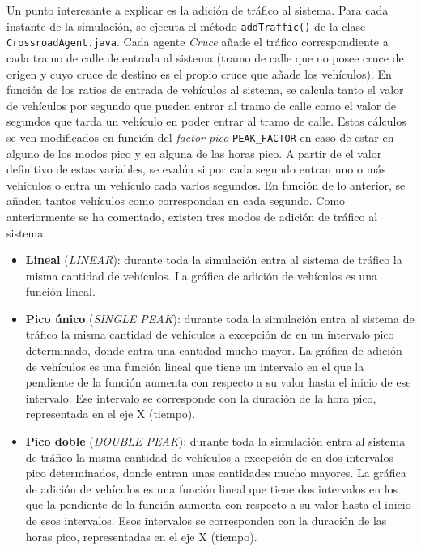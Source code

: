 Un punto interesante a explicar es la adición de tráfico al sistema. Para cada instante de la simulación, se ejecuta el método \lstinline{addTraffic()} de la clase \lstinline{CrossroadAgent.java}. Cada agente \textit{Cruce} añade el tráfico correspondiente a cada tramo de calle de entrada al sistema (tramo de calle que no posee cruce de origen y cuyo cruce de destino es el propio cruce que añade los vehículos). En función de los ratios de entrada de vehículos al sistema, se calcula tanto el valor de vehículos por segundo que pueden entrar al tramo de calle como el valor de segundos que tarda un vehículo en poder entrar al tramo de calle. Estos cálculos se ven modificados en función del \textit{factor pico} \lstinline{PEAK_FACTOR} en caso de estar en alguno de los modos pico y en alguna de las horas pico. A partir de el valor definitivo de estas variables, se evalúa si por cada segundo entran uno o más vehículos o entra un vehículo cada varios segundos. En función de lo anterior, se añaden tantos vehículos como correspondan en cada segundo. Como anteriormente se ha comentado, existen tres modos de adición de tráfico al sistema:
\begin{itemize}
    \item \textbf{Lineal} (\textit{LINEAR}): durante toda la simulación entra al sistema de tráfico la misma cantidad de vehículos. La gráfica de adición de vehículos es una función lineal.
    \item \textbf{Pico único} (\textit{SINGLE PEAK}): durante toda la simulación entra al sistema de tráfico la misma cantidad de vehículos a excepción de en un intervalo pico determinado, donde entra una cantidad mucho mayor. La gráfica de adición de vehículos es una función lineal que tiene un intervalo en el que la pendiente de la función aumenta con respecto a su valor hasta el inicio de ese intervalo. Ese intervalo se corresponde con la duración de la hora pico, representada en el eje X (tiempo). 
    \item \textbf{Pico doble} (\textit{DOUBLE PEAK}): durante toda la simulación entra al sistema de tráfico la misma cantidad de vehículos a excepción de en dos intervalos pico determinados, donde entran unas cantidades mucho mayores. La gráfica de adición de vehículos es una función lineal que tiene dos intervalos en los que la pendiente de la función aumenta con respecto a su valor hasta el inicio de esos intervalos. Esos intervalos se corresponden con la duración de las horas pico, representadas en el eje X (tiempo). 
\end{itemize}


